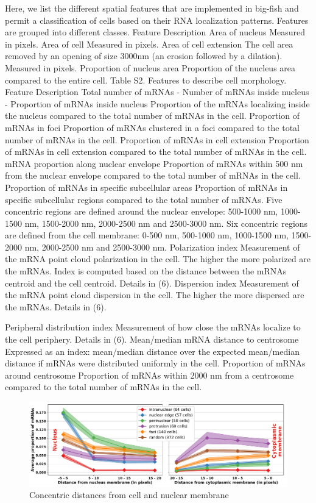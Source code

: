 Here, we list the different spatial features that are implemented in big-fish and permit a classification of cells based on their RNA localization patterns. Features are grouped into different classes.
Feature
Description
Area of nucleus
Measured in pixels.
Area of cell
Measured in pixels.
Area of cell extension
The cell area removed by an opening of size 3000nm (an erosion followed by a dilation). Measured in pixels.
Proportion of nucleus area
Proportion of the nucleus area compared to the entire cell.
Table S2. Features to describe cell morphology.
Feature
Description
Total number of mRNAs
-
Number of mRNAs inside nucleus
-
Proportion of mRNAs inside nucleus
Proportion of the mRNAs localizing inside the nucleus compared to the total number of mRNAs in the cell.
Proportion of mRNAs in foci
Proportion of mRNAs clustered in a foci compared to the total number of mRNAs in the cell.
Proportion of mRNAs in cell extension
Proportion of mRNAs in cell extension compared to the total number of mRNAs in the cell.
mRNA proportion along nuclear envelope
Proportion of mRNAs within 500 nm from the nuclear envelope compared to the total number of mRNAs in the cell.
Proportion of mRNAs in specific subcellular areas
Proportion of mRNAs in specific subcellular regions compared to the total number of mRNAs. Five concentric regions are defined around the nuclear envelope: 500-1000 nm, 1000-1500 nm, 1500-2000 nm, 2000-2500 nm and 2500-3000 nm. Six concentric regions are defined from the cell membrane: 0-500 nm, 500-1000 nm, 1000-1500 nm, 1500-2000 nm, 2000-2500 nm and 2500-3000 nm.
Polarization index
Measurement of the mRNA point cloud polarization in the cell. The higher the more polarized are the mRNAs. Index is computed based on the distance between the mRNAs centroid and the cell centroid. Details in (6).
Dispersion index
Measurement of the mRNA point cloud dispersion in the cell. The higher the more dispersed are the mRNAs. Details in (6).

Peripheral distribution index
Measurement of how close the mRNAs localize to the cell periphery. Details in (6).
Mean/median mRNA distance to centrosome
Expressed as an index: mean/median distance over the expected mean/median distance if mRNAs were distributed uniformly in the cell.
Proportion of mRNAs around centrosome
Proportion of mRNAs within 2000 nm from a centrosome compared to the total number of mRNAs in the cell.

\begin{figure}[h]
    \centering
    \includegraphics[width=1\textwidth]{figures/chapter4/plot_topography}
    \caption{Concentric distances from cell and nuclear membrane}
    \label{fig:features_topography}
\end{figure}

